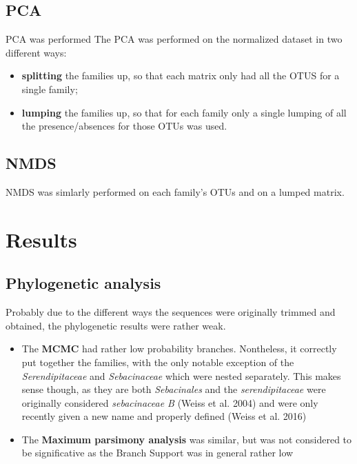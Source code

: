 \section{PCA}
\label{pca}

PCA was performed
The PCA was performed on the normalized dataset in two different ways:

\begin{itemize}
\item \textbf{splitting} the families up, so that each matrix only had all the OTUS for a single family;

\item \textbf{lumping} the families up, so that for each family only a single lumping of all the presence\slash absences for those OTUs was used.

\end{itemize}

\section{NMDS}
\label{nmds}

NMDS was simlarly performed on each family's OTUs and on a lumped matrix.

\chapter{Results}
\label{results}

\section{Phylogenetic analysis}
\label{phylogeneticanalysis}

Probably due to the different ways the sequences were originally trimmed and obtained, the phylogenetic results were rather weak.

\begin{itemize}
\item The \textbf{MCMC} had rather low probability branches. Nontheless, it correctly put together the families, with the only notable exception of the \emph{Serendipitaceae} and \emph{Sebacinaceae} which were nested separately. This makes sense though, as they are both \emph{Sebacinales} and the \emph{serendipitaceae} were originally considered \emph{sebacinaceae B} (Weiss et al. 2004) and were only recently given a new name and properly defined (Weiss et al. 2016)

\item The \textbf{Maximum parsimony analysis} was similar, but was not considered to be significative as the Branch Support was in general rather low

\end{itemize}




